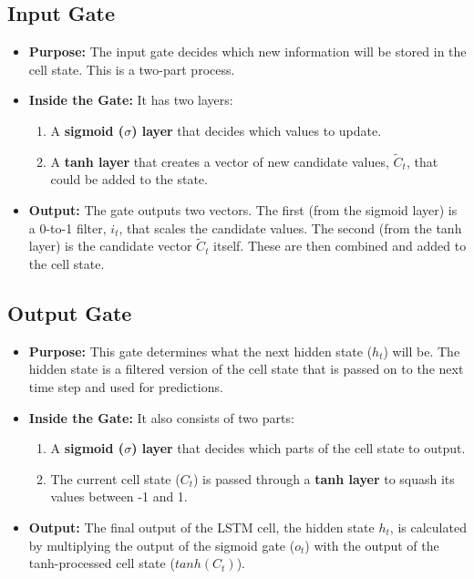 \documentclass[a4paper,12pt]{article}
\begin{document}
\subsection{Input Gate}
\begin{itemize}
    \item \textbf{Purpose:} The input gate decides which new information will be stored in the cell state. This is a two-part process.
    \item \textbf{Inside the Gate:} It has two layers:
        \begin{enumerate}
            \item A \textbf{sigmoid ($\sigma$) layer} that decides which values to update.
            \item A \textbf{tanh layer} that creates a vector of new candidate values, $\tilde{C}_t$, that could be added to the state.
        \end{enumerate}
    \item \textbf{Output:} The gate outputs two vectors. The first (from the sigmoid layer) is a 0-to-1 filter, $i_t$, that scales the candidate values. The second (from the tanh layer) is the candidate vector $\tilde{C}_t$ itself. These are then combined and added to the cell state.
\end{itemize}

\subsection{Output Gate}
\begin{itemize}
    \item \textbf{Purpose:} This gate determines what the next hidden state ($h_t$) will be. The hidden state is a filtered version of the cell state that is passed on to the next time step and used for predictions.
    \item \textbf{Inside the Gate:} It also consists of two parts:
        \begin{enumerate}
            \item A \textbf{sigmoid ($\sigma$) layer} that decides which parts of the cell state to output.
            \item The current cell state ($C_t$) is passed through a \textbf{tanh layer} to squash its values between -1 and 1.
        \end{enumerate}
    \item \textbf{Output:} The final output of the LSTM cell, the hidden state $h_t$, is calculated by multiplying the output of the sigmoid gate ($o_t$) with the output of the tanh-processed cell state ($tanh(C_t)$).
\end{itemize}
\end{document}
